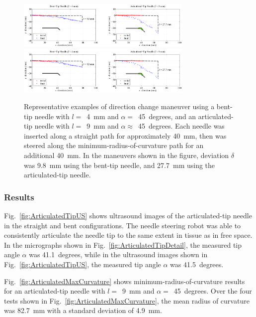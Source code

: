 \begin{figure}[!ht]
\centering
\includegraphics[width=0.75\textwidth]{Images/Chapter3/InsertAndTurn/InsertAndTurn1}
\includegraphics[width=0.75\textwidth]{Images/Chapter3/InsertAndTurn/InsertAndTurn2}
\caption[Maneuvers using bent-tip and articulated-tip needles]{Representative examples of direction change maneuver using a bent-tip needle with $l =$~4~mm and $\alpha =$~45~degrees, and an articulated-tip needle with $l =$~9~mm and $\alpha \approx$~45~degrees. Each needle was inserted along a straight path for approximately 40~mm, then was steered along the minimum-radius-of-curvature path for an additional 40~mm. In the maneuvers shown in the figure, deviation $\delta$ was 9.8~mm using the bent-tip needle, and 27.7~mm using the articulated-tip needle.}
\label{fig:InsertAndTurn}
\end{figure}

\subsubsection{Results}
Fig.~\ref{fig:ArticulatedTipUS} shows ultrasound images of the articulated-tip needle in the straight and bent configurations. The needle steering robot was able to consistently articulate the needle tip to the same extent in tissue as in free space. In the micrographs shown in Fig.~\ref{fig:ArticulatedTipDetail}, the measured tip angle $\alpha$ was 41.1~degrees, while in the ultrasound images shown in Fig.~\ref{fig:ArticulatedTipUS}, the measured tip angle $\alpha$ was 41.5~degrees.

Fig.~\ref{fig:ArticulatedMaxCurvature} shows minimum-radius-of-curvature results for an articulated-tip needle with $l =$~9~mm and $\alpha =$~45~degrees. Over the four tests shown in Fig.~\ref{fig:ArticulatedMaxCurvature}, the mean radius of curvature was 82.7~mm with a standard deviation of 4.9~mm.       

